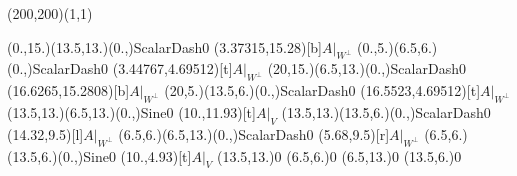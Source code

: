 \unitlength=1bp%

\begin{feynartspicture}(200,200)(1,1)

\FADiagram{}
\FAProp(0.,15.)(13.5,13.)(0.,){ScalarDash}{0}
\FALabel(3.37315,15.28)[b]{$A|_{W^\perp}$}
\FAProp(0.,5.)(6.5,6.)(0.,){ScalarDash}{0}
\FALabel(3.44767,4.69512)[t]{$A|_{W^\perp}$}
\FAProp(20,15.)(6.5,13.)(0.,){ScalarDash}{0}
\FALabel(16.6265,15.2808)[b]{$A|_{W^\perp}$}
\FAProp(20,5.)(13.5,6.)(0.,){ScalarDash}{0}
\FALabel(16.5523,4.69512)[t]{$A|_{W^\perp}$}
\FAProp(13.5,13.)(6.5,13.)(0.,){Sine}{0}
\FALabel(10.,11.93)[t]{$A|_V$}
\FAProp(13.5,13.)(13.5,6.)(0.,){ScalarDash}{0}
\FALabel(14.32,9.5)[l]{$A|_{W^\perp}$}
\FAProp(6.5,6.)(6.5,13.)(0.,){ScalarDash}{0}
\FALabel(5.68,9.5)[r]{$A|_{W^\perp}$}
\FAProp(6.5,6.)(13.5,6.)(0.,){Sine}{0}
\FALabel(10.,4.93)[t]{$A|_V$}
\FAVert(13.5,13.){0}
\FAVert(6.5,6.){0}
\FAVert(6.5,13.){0}
\FAVert(13.5,6.){0}
\end{feynartspicture}

